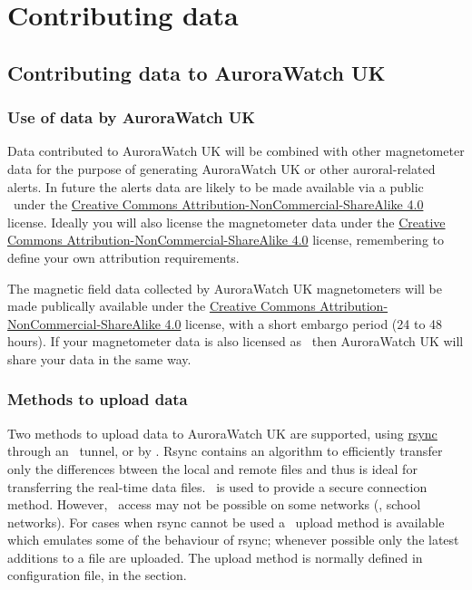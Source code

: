 \chapter{Contributing data}

\section{Contributing data to AuroraWatch UK}

\subsection{Use of data by AuroraWatch UK }

Data contributed to AuroraWatch UK will be combined with other
magnetometer data for the purpose of generating AuroraWatch UK or
other auroral-related alerts. In future the alerts data are likely to
be made available via a public \api\ under the
\href{\ccByNcSaFourUrl}{Creative Commons
  Attribution-NonCommercial-ShareAlike 4.0} license. Ideally you will
also license the magnetometer data under the
\href{\ccByNcSaFourUrl}{Creative Commons
  Attribution-NonCommercial-ShareAlike 4.0} license, remembering to
define your own attribution requirements.


The magnetic field data collected by AuroraWatch UK magnetometers will
be made publically available under the
\href{\ccByNcSaFourUrl}{Creative Commons
  Attribution-NonCommercial-ShareAlike 4.0} license, with a short
embargo period (24 to 48 hours). If your magnetometer data is also
licensed as \ccByNcSaFour\ then AuroraWatch UK will share your data in
the same way.

\subsection{Methods to upload data}
Two methods to upload data to AuroraWatch UK are supported, using
\href{\rsyncUrl}{rsync} through an \ssh\ tunnel, or by \http. Rsync
contains an algorithm to efficiently transfer only the differences
btween the local and remote files and thus is ideal for transferring
the real-time data files. \ssh\ is used to provide a secure connection
method. However, \ssh\ access may not be possible on some networks
(\eg, school networks). For cases when rsync cannot be used a \http\
upload method is available which emulates some of the behaviour of
rsync; whenever possible only the latest additions to a file are
uploaded. The upload method is normally defined in 
configuration file, in the \filename{[upload]} section.


